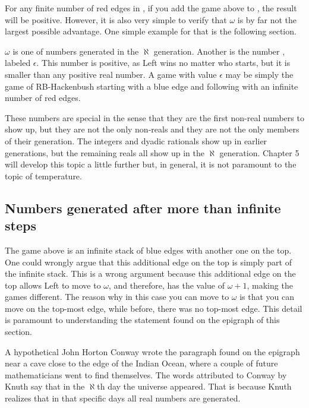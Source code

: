 For any finite number of red edges in \Gm{}, if you add the game above to \Gm{}, the result will be positive. However, it is also very simple to verify that $\omega$ is by far not the largest possible advantage. One simple  example for that is the following section.

$\omega$ is one of numbers generated in the $\aleph$ generation. Another is the number , labeled $\epsilon$. This number is positive, as Left wins no matter who starts, but it is smaller than any positive real number. A game with value $\epsilon$ may be simply the game of RB-Hackenbush starting with a blue edge and following with an infinite number of red edges.

These numbers are special in the sense that they are the first non-real numbers to show up, but they are not the only non-reals and they are not the only members of their generation. The integers and dyadic rationals show up in earlier generations, but the remaining reals all show up in the $\aleph$ generation. Chapter 5 will develop this topic a little further but, in general, it is not paramount to the topic of temperature.

\subsection*{Numbers generated after more than infinite steps}



The game above is an infinite stack of blue edges with another one on the top. One could wrongly argue that this additional edge on the top is simply part of the infinite stack. This is a wrong argument because this additional edge on the top allows Left to move to $\omega$, and therefore, has the value of $\omega+1$, making the games different. The reason why in this case you can move to $\omega$ is that you can move on the top-most edge, while before, there was no top-most edge. This detail is paramount to understanding the statement found on the epigraph of this section.

A hypothetical John Horton Conway wrote the paragraph found on the epigraph near a cave close to the edge of the Indian Ocean, where a couple of future mathematicians went to find themselves. The words attributed to Conway by Knuth say that in the $\aleph$th day the universe appeared. That is because Knuth realizes that in that specific days all real numbers are generated.

